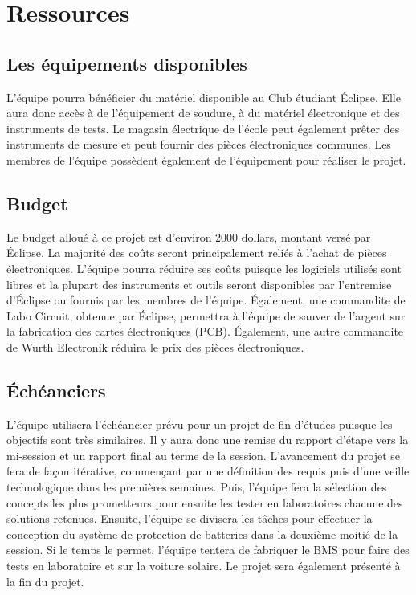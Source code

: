 \section{Ressources}

\subsection{Les équipements disponibles}
L'équipe pourra bénéficier du matériel disponible au Club étudiant Éclipse. Elle aura donc accès à de l'équipement de soudure, à du matériel électronique et des instruments de tests. Le magasin électrique de l'école peut également prêter des instruments de mesure et peut fournir des pièces électroniques communes. Les membres de l'équipe possèdent également de l'équipement pour réaliser le projet.

\subsection{Budget}
Le budget alloué à ce projet est d'environ 2000 dollars, montant versé par Éclipse. La majorité des coûts seront principalement reliés à l'achat de pièces électroniques. L'équipe pourra réduire ses coûts puisque les logiciels utilisés sont libres et la plupart des instruments et outils seront disponibles par l'entremise d'Éclipse ou fournis par les membres de l'équipe. Également, une commandite de Labo Circuit, obtenue par Éclipse, permettra à l'équipe de sauver de l'argent sur la fabrication des cartes électroniques (PCB). Également, une autre commandite de Wurth Electronik réduira le prix des pièces électroniques.

\subsection{Échéanciers}
L'équipe utilisera l'échéancier prévu pour un projet de fin d'études puisque les objectifs sont très similaires. Il y aura donc une remise du rapport d'étape vers la mi-session et un rapport final au terme de la session. L'avancement du projet se fera de façon itérative, commençant par une définition des requis puis d'une veille technologique dans les premières semaines. Puis, l'équipe fera la sélection des concepts les plus prometteurs pour ensuite les tester en laboratoires chacune des solutions retenues. Ensuite, l'équipe se divisera les tâches pour effectuer la conception du système de protection de batteries dans la deuxième moitié de la session. Si le temps le permet, l'équipe tentera de fabriquer le BMS pour faire des tests en laboratoire et sur la voiture solaire. Le projet sera également présenté à la fin du projet.
